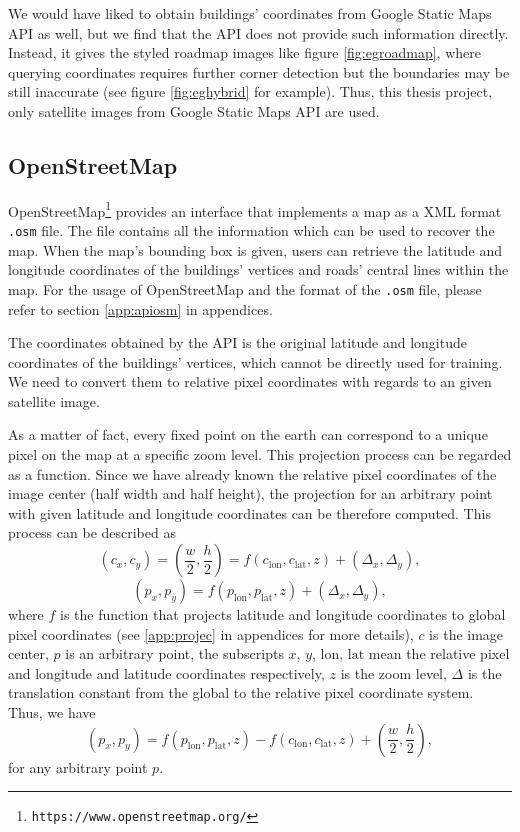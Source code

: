 

We would have liked to obtain buildings' coordinates from Google Static Maps API as well, but we find that the API does not provide such information directly. Instead, it gives the styled roadmap images like figure \ref{fig:egroadmap}, where querying coordinates requires further corner detection but the boundaries may be still inaccurate (see figure \ref{fig:eghybrid} for example). Thus, this thesis project, only satellite images from Google Static Maps API are used.

\subsection{OpenStreetMap}\label{apiosm}
OpenStreetMap\setcounter{footnote}{0}\footnote{\lstinline{https://www.openstreetmap.org/}} provides an interface that implements a map as a XML format \lstinline{.osm} file. The file contains all the information which can be used to recover the map. When the map's bounding box is given, users can retrieve the latitude and longitude coordinates of the buildings' vertices and roads' central lines within the map. For the usage of OpenStreetMap and the format of the \lstinline{.osm} file, please refer to section \ref{app:apiosm} in appendices.

The coordinates obtained by the API is the original latitude and longitude coordinates of the buildings' vertices, which cannot be directly used for training. We need to convert them to relative pixel coordinates with regards to an given satellite image.

As a matter of fact, every fixed point on the earth can correspond to a unique pixel on the map at a specific zoom level. This projection process can be regarded as a function. Since we have already known the relative pixel coordinates of the image center (half width and half height), the projection for an arbitrary point with given latitude and longitude coordinates can be therefore computed. This process can be described as
\begin{equation}
	(c_x, c_y) = (\frac{w}{2}, \frac{h}{2}) = f(c_{\text{lon}}, c_{\text{lat}}, z) + (\Delta_x, \Delta_y),
\end{equation}
\begin{equation}
	(p_x, p_y) = f(p_{\text{lon}}, p_{\text{lat}}, z) + (\Delta_x, \Delta_y),
\end{equation}
where $f$ is the function that projects latitude and longitude coordinates to global pixel coordinates (see \ref{app:projec} in appendices for more details), $c$ is the image center, $p$ is an arbitrary point, the subscripts $x$, $y$, $\text{lon}$, $\text{lat}$ mean the relative pixel and longitude and latitude coordinates respectively, $z$ is the zoom level, $\Delta$ is the translation constant from the global to the relative pixel coordinate system. Thus, we have
\begin{equation}
	(p_x, p_y) = f(p_{\text{lon}}, p_{\text{lat}}, z) - f(c_{\text{lon}}, c_{\text{lat}}, z) + (\frac{w}{2}, \frac{h}{2}),
\end{equation}
for any arbitrary point $p$.

